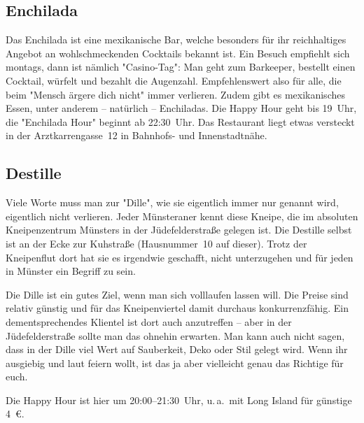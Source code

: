{\begin{multicols*}{2}
\subsection{Enchilada}
Das Enchilada ist eine mexikanische Bar, welche besonders für ihr reichhaltiges Angebot an wohlschmeckenden Cocktails bekannt ist.
Ein Besuch empfiehlt sich montags, dann ist nämlich "Casino-Tag":
Man geht zum Barkeeper, bestellt einen Cocktail, würfelt und bezahlt die Augenzahl.
Empfehlenswert also für alle, die beim "Mensch ärgere dich nicht" immer verlieren.
Zudem gibt es mexikanisches Essen, unter anderem -- natürlich -- Enchiladas.
Die Happy Hour geht bis 19~Uhr, die "Enchilada Hour" beginnt ab 22:30~Uhr.
Das Restaurant liegt etwas versteckt in der Arztkarrengasse~12 in Bahnhofs- und Innenstadtnähe.

\begin{center}
\end{center}

\subsection{Destille}
Viele Worte muss man zur "Dille", wie sie eigentlich immer nur genannt wird, eigentlich nicht verlieren.
Jeder Münsteraner kennt diese Kneipe, die im absoluten Kneipenzentrum Münsters in der Jüdefelderstraße gelegen ist.
Die Destille selbst ist an der Ecke zur Kuhstraße (Hausnummer~10 auf dieser).
Trotz der Kneipenflut dort hat sie es irgendwie geschafft, nicht unterzugehen und für jeden in Münster ein Begriff zu sein.

Die Dille ist ein gutes Ziel, wenn man sich volllaufen lassen will.
Die Preise sind relativ günstig und für das Kneipenviertel damit durchaus konkurrenzfähig.
Ein dementsprechendes Klientel ist dort auch anzutreffen -- aber in der Jüdefelderstraße sollte man das ohnehin erwarten.
Man kann auch nicht sagen, dass in der Dille viel Wert auf Sauberkeit, Deko oder Stil gelegt wird.
Wenn ihr ausgiebig und laut feiern wollt, ist das ja aber vielleicht genau das Richtige für euch.

Die Happy Hour ist hier um 20:00--21:30~Uhr, u.\,a.\ mit Long Island für günstige \SI{4}{\euro}.

\begin{center}
\end{center}


\end{multicols*}}
